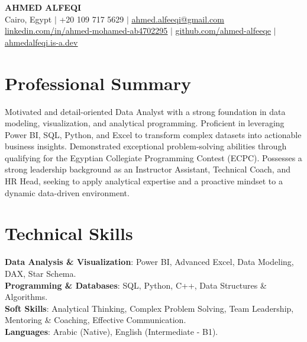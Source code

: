 \documentclass[letterpaper,11pt]{article}
\begin{document}
\begin{center}
    \textbf{\Huge \scshape AHMED ALFEQI} \\ \vspace{3pt}
    \small Cairo, Egypt $|$ +20 109 717 5629 $|$ \href{mailto:ahmed.alfeeqi@gmail.com}{\underline{ahmed.alfeeqi@gmail.com}} \\ \vspace{2pt}
    \href{https://linkedin.com/in/ahmed-mohamed-ab4702295}{\underline{linkedin.com/in/ahmed-mohamed-ab4702295}} $|$ 
    \href{https://github.com/ahmed-alfeeqe}{\underline{github.com/ahmed-alfeeqe}} $|$ 
    \href{https://ahmedalfeqi.is-a.dev}{\underline{ahmedalfeqi.is-a.dev}}
\end{center}


\section{Professional Summary}
  \small{
    Motivated and detail-oriented Data Analyst with a strong foundation in data modeling, visualization, and analytical programming. Proficient in leveraging Power BI, SQL, Python, and Excel to transform complex datasets into actionable business insights. Demonstrated exceptional problem-solving abilities through qualifying for the Egyptian Collegiate Programming Contest (ECPC). Possesses a strong leadership background as an Instructor Assistant, Technical Coach, and HR Head, seeking to apply analytical expertise and a proactive mindset to a dynamic data-driven environment.
  }


\section{Technical Skills}
 \begin{itemize}[leftmargin=0.15in, label={}]
    \small{\item{
     \textbf{Data Analysis \& Visualization}{: Power BI, Advanced Excel, Data Modeling, DAX, Star Schema.} \\
     \textbf{Programming \& Databases}{: SQL, Python, C++, Data Structures \& Algorithms.} \\
     \textbf{Soft Skills}{: Analytical Thinking, Complex Problem Solving, Team Leadership, Mentoring \& Coaching, Effective Communication.} \\
     \textbf{Languages}{: Arabic (Native), English (Intermediate - B1).}
    }}
 \end{itemize}
\end{document}
